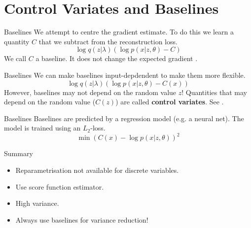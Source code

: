 \documentclass[14pt]{beamer}
\begin{document}
\section{Control Variates and Baselines}

\begin{frame}
\tableofcontents[currentsection]
\end{frame}

\begin{frame}{Baselines}
We attempt to centre the gradient estimate. To do this we learn a quantity $ C $ that we subtract
from the reconstruction loss.
\begin{equation*}
\log q(z|\lambda) \left( \log p(x|z,\theta) - C \right)
\end{equation*}
We call $ C $ a baseline. It does not change the expected gradient \citep{Williams:1992}.
\end{frame}

\begin{frame}{Baselines}
We can make baselines input-depdendent to make them more flexible.
\begin{equation*}
\log q(z|\lambda) \left( \log p(x|z,\theta) - C(x) \right)
\end{equation*}
However, baselines may not depend on the random value $ z $! Quantities that may depend on the
random value ($ C(z) $) are called \textbf{control variates}. See \cite{PaisleyEtAl:2012, RanganathEtAl:2014,GregorEtAl:2014}.
\end{frame}

\begin{frame}{Baselines}
Baselines are predicted by a regression model (e.g. a neural net). The model is trained using 
an $ L_{2} $-loss.
\begin{equation*}
\min \left(C(x) - \log p(x|z,\theta)\right)^{2}
\end{equation*}
\end{frame}

\begin{frame}{Summary}
\begin{itemize}
\pause
\item Reparametrisation not available for discrete variables.
\pause
\item Use score function estimator.
\pause
\item High variance.
\pause
\item Always use baselines for variance reduction!
\end{itemize}
\end{frame}
\end{document}
